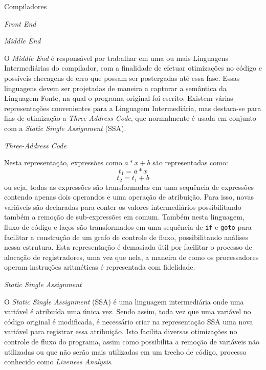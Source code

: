 \begin{section}{Compiladores}
\begin{subsection}{\textit{Front End}}
\end{subsection}

\begin{subsection}{\textit{Middle End}}

    O \textit{Middle End} é responsável por trabalhar em uma ou mais
 Linguagens Intermediárias do compilador, com a finalidade de efetuar
otimizações no código e possíveis checagens de erro que possam ser
postergadas até essa fase. Essas linguagens devem ser projetadas
de maneira a capturar a semântica da Linguagem Fonte, na qual o programa original foi
escrito.
Existem várias representações convenientes para a Linguagem Intermediária,
mas destaca-se para fins de otimização
a \textit{Three-Address Code}, que normalmente é usada em conjunto com
a \textit{Static Single Assignment} (SSA).

\begin{subsubsection}{\textit{Three-Address Code}}

Nesta representação, expressões como $a*x + b$ são
representadas como:
$$ t_1 = a*x$$
\vspace*{-1cm}
$$ t_2 = t_1 + b $$
ou seja, todas as expressões são transformadas em uma sequência de expressões
contendo apenas dois operandos e uma operação de atribuição. Para isso,
novas variáveis são declaradas para conter os valores intermediários
possibilitando também a remoção de sub-expressões em comum. Também nesta
linguagem, fluxo de código e laços são transformados em uma sequência de
\texttt{if} e \texttt{goto} para facilitar a construção de um grafo de
controle de fluxo, possibilitando análises nessa estrutura.
Esta representação é demasiada útil por facilitar o processo de alocação
de registradores, uma vez que nela, a maneira de como os processadores
operam instruções aritméticas é representada com fidelidade\citep{lattner2002llvm}.

\end{subsubsection}
\begin{subsubsection}{\textit{Static Single Assignment}}

O \textit{Static Single Assignment} (SSA) é uma linguagem intermediária
onde uma variável é atribuída uma única vez. Sendo assim, toda vez que
uma variável no código original é modificada, é necessário criar na representação SSA uma
nova variável para registrar essa atribuição. Isto facilita diversas
otimizações no controle de fluxo do programa, assim como possibilita a remoção
de variáveis não utilizadas ou que não serão mais utilizadas em um
trecho de código, processo conhecido como \textit{Liveness Analysis}.


\end{subsubsection}
\end{subsection}
\end{section}
